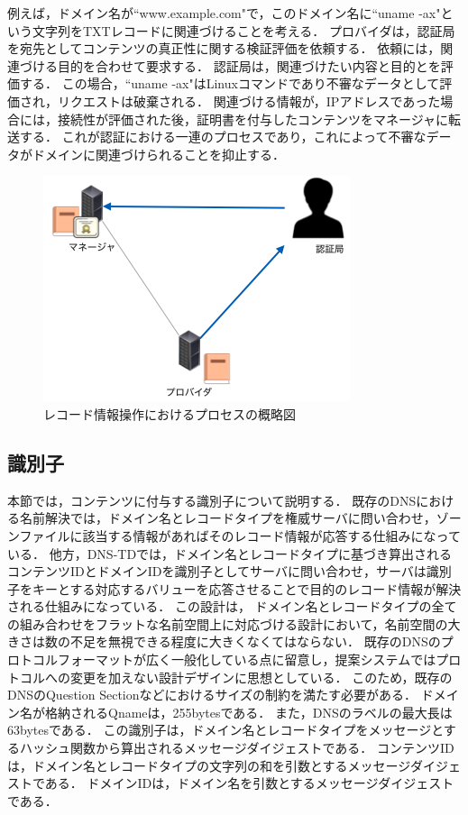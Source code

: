 例えば，ドメイン名が``www.example.com"で，このドメイン名に``uname -ax"という文字列をTXTレコードに関連づけることを考える．
プロバイダは，認証局を宛先としてコンテンツの真正性に関する検証評価を依頼する．
依頼には，関連づける目的を合わせて要求する．
認証局は，関連づけたい内容と目的とを評価する．
この場合，``uname -ax"はLinuxコマンドであり不審なデータとして評価され，リクエストは破棄される．
関連づける情報が，IPアドレスであった場合には，接続性が評価された後，証明書を付与したコンテンツをマネージャに転送する．
これが認証における一連のプロセスであり，これによって不審なデータがドメインに関連づけられることを抑止する．
\begin{figure}[h]
 \centering
 \includegraphics[scale=0.7]{figure/certificate-procedure.png}
 \caption{レコード情報操作におけるプロセスの概略図}
 \label{fig:manager-provider}
\end{figure}


\subsection{識別子}
本節では，コンテンツに付与する識別子について説明する．
既存のDNSにおける名前解決では，ドメイン名とレコードタイプを権威サーバに問い合わせ，ゾーンファイルに該当する情報があればそのレコード情報が応答する仕組みになっている．
他方，DNS-TDでは，ドメイン名とレコードタイプに基づき算出されるコンテンツIDとドメインIDを識別子としてサーバに問い合わせ，サーバは識別子をキーとする対応するバリューを応答させることで目的のレコード情報が解決される仕組みになっている．
この設計は，
ドメイン名とレコードタイプの全ての組み合わせをフラットな名前空間上に対応づける設計において，名前空間の大きさは数の不足を無視できる程度に大きくなくてはならない．
既存のDNSのプロトコルフォーマットが広く一般化している点に留意し，提案システムではプロトコルへの変更を加えない設計デザインに思想としている．
このため，既存のDNSのQuestion Sectionなどにおけるサイズの制約を満たす必要がある．
ドメイン名が格納されるQnameは，255bytesである．
また，DNSのラベルの最大長は63bytesである．
この識別子は，ドメイン名とレコードタイプをメッセージとするハッシュ関数から算出されるメッセージダイジェストである．
コンテンツIDは，ドメイン名とレコードタイプの文字列の和を引数とするメッセージダイジェストである．
ドメインIDは，ドメイン名を引数とするメッセージダイジェストである．

